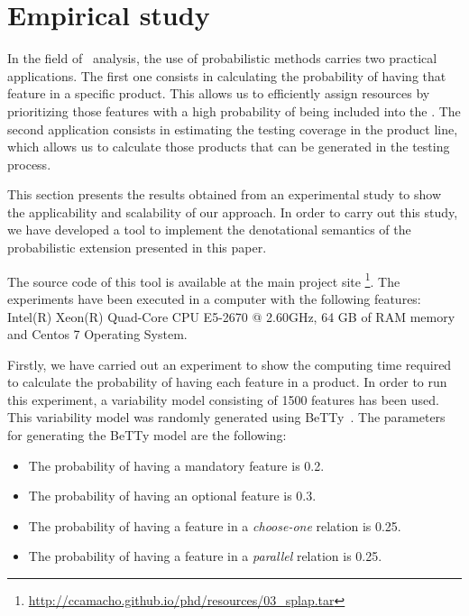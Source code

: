 
\section{Empirical study}
\label{sec:stat:impl}

In the field of \SPLs\ analysis, the use of probabilistic methods carries two practical applications. The first one consists in calculating the probability of having that feature in a specific product. This allows us to efficiently assign resources by prioritizing those features with a high probability of being included into the \SPL. The second application consists in estimating the testing coverage in the product line, which allows us to calculate those products that can be generated in the testing process.

This section presents the results obtained from an experimental study to show the applicability and scalability of our
approach.
In order to carry out this study, we have developed a tool to implement the denotational semantics of the
probabilistic extension presented in this paper.

The source code
of this tool is available at the main project site
\footnote{\url{http://ccamacho.github.io/phd/resources/03_splap.tar}}.
The experiments have been executed in a computer with the following features: Intel(R) Xeon(R) Quad-Core CPU E5-2670 @ 2.60GHz, 64 GB of RAM memory and Centos 7 Operating System.


Firstly, we have carried out an experiment to show the computing time required to calculate the probability of having
each feature in a product. In order to run this experiment, a variability model consisting of
1500 features has been used. This variability model
was randomly generated using BeTTy~\cite{SeguraHBC11}. The parameters for
generating the BeTTy model are the following:

\begin{itemize}
        \item The probability of having a mandatory feature is 0.2.
        \item The probability of having an optional feature is 0.3.
        \item The probability of having a feature in a \emph{choose-one} relation is 0.25.
        \item The probability of having a feature in a \emph{parallel} relation is 0.25.
\end{itemize}

